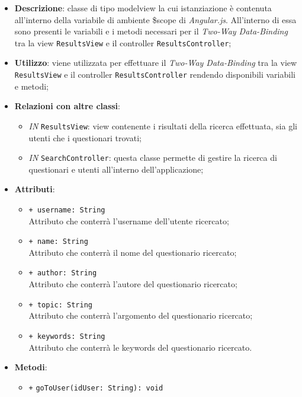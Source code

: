 	\begin{itemize}
		\item \textbf{Descrizione}: classe di tipo modelview la cui istanziazione è contenuta all'interno della variabile di ambiente \$scope di \textit{Angular.js}. All'interno di essa sono presenti le variabili e i metodi necessari per il \textit{Two-Way Data-Binding} tra la view \texttt{ResultsView} e il controller \texttt{ResultsController};
		\item \textbf{Utilizzo}: viene utilizzata per effettuare il \textit{Two-Way Data-Binding} tra la view \texttt{ResultsView} e il controller \texttt{ResultsController} rendendo disponibili variabili e metodi;
		\item \textbf{Relazioni con altre classi}: 
		\begin{itemize}
			\item \textit{IN} \texttt{ResultsView}: view contenente i risultati della ricerca effettuata, sia gli utenti che i questionari trovati; 
			\item \textit{IN} \texttt{SearchController}: questa classe permette di gestire la ricerca di questionari e utenti all’interno dell’applicazione;
		\end{itemize}
		\item \textbf{Attributi}: 
		\begin{itemize}
			\item \texttt{+ username: String} \\ Attributo che conterrà l'username dell'utente ricercato;
			\item \texttt{+ name: String} \\ Attributo che conterrà il nome del questionario ricercato;
			\item \texttt{+ author: String} \\ Attributo che conterrà l'autore del questionario ricercato;
			\item \texttt{+ topic: String} \\ Attributo che conterrà l'argomento del questionario ricercato;
			\item \texttt{+ keywords: String} \\ Attributo che conterrà le keywords del questionario ricercato.
		\end{itemize}
		\item \textbf{Metodi}: 
		\begin{itemize}
				\item \texttt{+} \texttt{goToUser(idUser: String): void} \\

\end{itemize}
\end{itemize}
